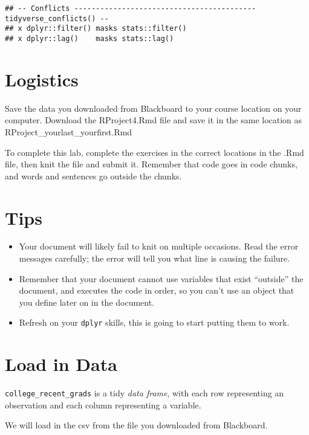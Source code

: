 \documentclass[
]{article}
\begin{document}
\begin{verbatim}
## -- Conflicts ------------------------------------------ tidyverse_conflicts() --
## x dplyr::filter() masks stats::filter()
## x dplyr::lag()    masks stats::lag()
\end{verbatim}

\hypertarget{logistics}{%
\section{Logistics}\label{logistics}}

Save the data you downloaded from Blackboard to your course location on
your computer. Download the RProject4.Rmd file and save it in the same
location as RProject\_yourlast\_yourfirst.Rmd

To complete this lab, complete the exercises in the correct locations in
the .Rmd file, then knit the file and submit it. Remember that code goes
in code chunks, and words and sentences go outside the chunks.

\hypertarget{tips}{%
\section{Tips}\label{tips}}

\begin{itemize}
\item
  Your document will likely fail to knit on multiple occasions. Read the
  error messages carefully; the error will tell you what line is causing
  the failure.
\item
  Remember that your document cannot use variables that exist
  ``outside'' the document, and executes the code in order, so you can't
  use an object that you define later on in the document.
\item
  Refresh on your \texttt{dplyr} skills, this is going to start putting
  them to work.
\end{itemize}

\hypertarget{load-in-data}{%
\section{Load in Data}\label{load-in-data}}

\texttt{college\_recent\_grads} is a tidy \emph{data frame}, with each
row representing an observation and each column representing a variable.

We will load in the csv from the file you downloaded from Blackboard.
\end{document}
